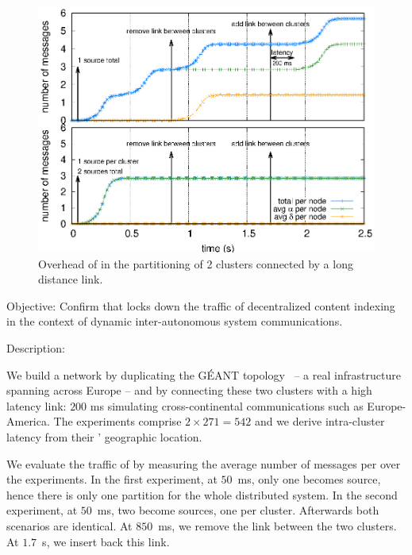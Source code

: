\begin{asparadesc}

\begin{figure}
  \centering\includegraphics[width=\FIGSCALE\columnwidth]{img/as_cast_geant.eps}
  \caption{\label{fig:geant}Overhead of \NAME in the partitioning of 2 clusters connected by a long distance link.}
\end{figure}

  
\item [Objective:] Confirm that \NAME locks down the traffic of decentralized content
  indexing in the context of dynamic inter-autonomous system
  communications.
  
\item [Description:]

We build a network by duplicating the G{\'E}ANT
topology~\cite{knight2011internet} -- a real infrastructure spanning
across Europe -- and by connecting these two clusters with a high
latency link: $200$ ms simulating cross-continental communications
such as Europe-America. The experiments comprise $2 \times 271 = 542$
\processes and we derive intra-cluster latency from their \processes'
geographic location.

\noindent We evaluate the traffic of \NAME by measuring the average
number of messages per \process over the experiments. In the first
experiment, at $50$~ms, only one \process becomes source, hence there
is only one partition for the whole distributed system. In the second
experiment, at $50$~ms, two \processes become sources, one per
cluster. Afterwards both scenarios are identical. At $850$~ms, we
remove the link between the two clusters. At $1.7$~s, we insert back this
link.



\end{asparadesc}
